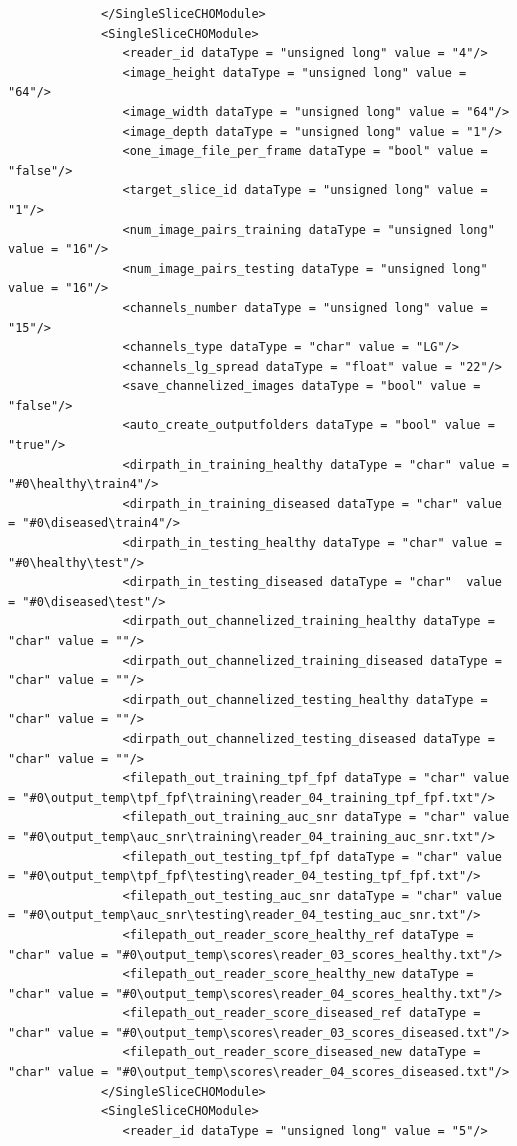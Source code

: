 \begin{lstlisting}
			 </SingleSliceCHOModule>
			 <SingleSliceCHOModule>
				<reader_id dataType = "unsigned long" value = "4"/>
				<image_height dataType = "unsigned long" value = "64"/>
				<image_width dataType = "unsigned long" value = "64"/>
				<image_depth dataType = "unsigned long" value = "1"/>
				<one_image_file_per_frame dataType = "bool" value = "false"/>
				<target_slice_id dataType = "unsigned long" value = "1"/>
				<num_image_pairs_training dataType = "unsigned long" value = "16"/>
				<num_image_pairs_testing dataType = "unsigned long" value = "16"/>
				<channels_number dataType = "unsigned long" value = "15"/>	
				<channels_type dataType = "char" value = "LG"/>
				<channels_lg_spread dataType = "float" value = "22"/>
				<save_channelized_images dataType = "bool" value = "false"/>
				<auto_create_outputfolders dataType = "bool" value = "true"/>
				<dirpath_in_training_healthy dataType = "char" value = "#0\healthy\train4"/>
				<dirpath_in_training_diseased dataType = "char" value = "#0\diseased\train4"/>
				<dirpath_in_testing_healthy dataType = "char" value = "#0\healthy\test"/>
				<dirpath_in_testing_diseased dataType = "char"  value = "#0\diseased\test"/>
				<dirpath_out_channelized_training_healthy dataType = "char" value = ""/>
				<dirpath_out_channelized_training_diseased dataType = "char" value = ""/>
				<dirpath_out_channelized_testing_healthy dataType = "char" value = ""/>
				<dirpath_out_channelized_testing_diseased dataType = "char" value = ""/>
				<filepath_out_training_tpf_fpf dataType = "char" value = "#0\output_temp\tpf_fpf\training\reader_04_training_tpf_fpf.txt"/>
				<filepath_out_training_auc_snr dataType = "char" value = "#0\output_temp\auc_snr\training\reader_04_training_auc_snr.txt"/>
				<filepath_out_testing_tpf_fpf dataType = "char" value = "#0\output_temp\tpf_fpf\testing\reader_04_testing_tpf_fpf.txt"/>
				<filepath_out_testing_auc_snr dataType = "char" value = "#0\output_temp\auc_snr\testing\reader_04_testing_auc_snr.txt"/>
				<filepath_out_reader_score_healthy_ref dataType = "char" value = "#0\output_temp\scores\reader_03_scores_healthy.txt"/>
				<filepath_out_reader_score_healthy_new dataType = "char" value = "#0\output_temp\scores\reader_04_scores_healthy.txt"/>
				<filepath_out_reader_score_diseased_ref dataType = "char" value = "#0\output_temp\scores\reader_03_scores_diseased.txt"/>
				<filepath_out_reader_score_diseased_new dataType = "char" value = "#0\output_temp\scores\reader_04_scores_diseased.txt"/>
			 </SingleSliceCHOModule>
			 <SingleSliceCHOModule>
				<reader_id dataType = "unsigned long" value = "5"/>

\end{lstlisting}
